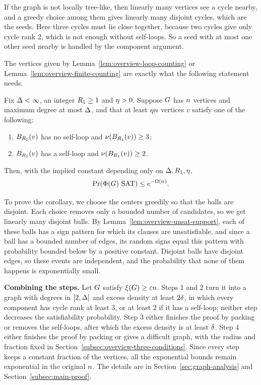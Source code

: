 If the graph is not locally tree-like, then linearly many vertices see a cycle
nearby, and a greedy choice among them gives linearly many disjoint cycles,
which are the seeds. Here three cycles must lie close together, because two
cycles give only cycle rank \(2\), which is not enough without self-loops. So
a seed with at most one other seed nearby is handled by the component argument.

The vertices given by Lemma~\ref{lem:overview-loop-counting} or
Lemma~\ref{lem:overview-finite-counting} are exactly what the following
statement needs.

\begin{corollary}\label{cor:overview-packing}
Fix \(\Delta<\infty\), an integer \(R_1\ge1\) and \(\eta>0\). Suppose \(G\)
has \(n\) vertices and maximum degree at most \(\Delta\), and that at least
\(\eta n\) vertices \(v\) satisfy one of the following:
\begin{enumerate}[label=(\arabic*),leftmargin=3em]
\item \(B_{R_1}(v)\) has no self-loop and \(\nu(B_{R_1}(v))\ge3\);
\item \(B_{R_1}(v)\) has a self-loop and \(\nu(B_{R_1}(v))\ge2\).
\end{enumerate}
Then, with the implied constant depending only on \(\Delta,R_1,\eta\),
\[
  \Prx{\rform{\Gin}\SAT}\le e^{-\Omega(\nvert)} .
\]
\end{corollary}

To prove the corollary, we choose the centers greedily so that the balls are
disjoint. Each choice removes only a bounded number of candidates, so we get
linearly many disjoint balls. By Lemma~\ref{lem:overview-unsat-support}, each
of these balls has a sign pattern for which its clauses are unsatisfiable, and
since a ball has a bounded number of edges, its random signs equal this pattern
with probability bounded below by a positive constant. Disjoint balls have
disjoint edges, so these events are independent, and the probability that none
of them happens is exponentially small.

\medskip
\noindent\textbf{Combining the steps.} Let \(G\) satisfy
\(\xi(G)\ge\varepsilon n\). Steps 1 and 2 turn it into a graph with degrees
in \([2,\Delta]\) and excess density at least \(2\delta\), in which every
component has cycle rank at least \(3\), or at least \(2\) if it has a
self-loop; neither step decreases the satisfiability probability. Step 3 either
finishes the proof by packing or removes the self-loops, after which the excess
density is at least \(\delta\). Step 4 either finishes the proof by packing or
gives a difficult graph, with the radius and fraction fixed in
Section~\ref{subsec:overview-three-conditions}. Since every step keeps a constant fraction of the vertices, all the
exponential bounds remain exponential in the original \(n\). The details
are in Section~\ref{sec:graph-analysis} and Section~\ref{subsec:main-proof}.


